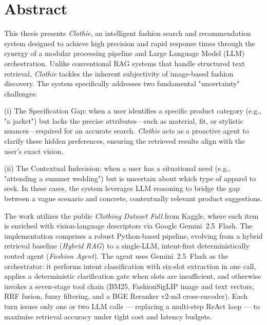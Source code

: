 \documentclass[12pt, twoside]{report}
\newcommand{\addchaptertoc}[1]{\addcontentsline{toc}{chapter}{#1}}
\begin{document}
\chapter*{Abstract}
\addchaptertoc{Abstract}

\noindent
This thesis presents \textit{Clothie}, an intelligent fashion search and recommendation system designed to achieve high precision and rapid response times through the synergy of a modular processing pipeline and Large Language Model (LLM) orchestration. Unlike conventional RAG systems that handle structured text retrieval, \textit{Clothie} tackles the inherent subjectivity of image-based fashion discovery. The system specifically addresses two fundamental "uncertainty" challenges:

\noindent
(i) The Specification Gap: when a user identifies a specific product category (e.g., "a jacket") but lacks the precise attributes—such as material, fit, or stylistic nuances—required for an accurate search. \textit{Clothie} acts as a proactive agent to clarify these hidden preferences, ensuring the retrieved results align with the user's exact vision.

\noindent
(ii) The Contextual Indecision: when a user has a situational need (e.g., "attending a summer wedding") but is uncertain about which type of apparel to seek. In these cases, the system leverages LLM reasoning to bridge the gap between a vague scenario and concrete, contextually relevant product suggestions.

\noindent
The work utilizes the public \textit{Clothing Dataset Full} from Kaggle, where each item is enriched with vision-language descriptors via Google Gemini~2.5~Flash. The implementation comprises a robust Python-based pipeline, evolving from a hybrid retrieval baseline (\textit{Hybrid RAG}) to a single-LLM, intent-first deterministically routed agent (\textit{Fashion Agent}). The agent uses Gemini~2.5~Flash as the orchestrator: it performs intent classification with six-slot extraction in one call, applies a deterministic clarification gate when slots are insufficient, and otherwise invokes a seven-stage tool chain (BM25, FashionSigLIP image and text vectors, RRF fusion, fuzzy filtering, and a BGE Reranker v2-m3 cross-encoder). Each turn issues only one or two LLM calls --- replacing a multi-step ReAct loop --- to maximise retrieval accuracy under tight cost and latency budgets.
\end{document}

